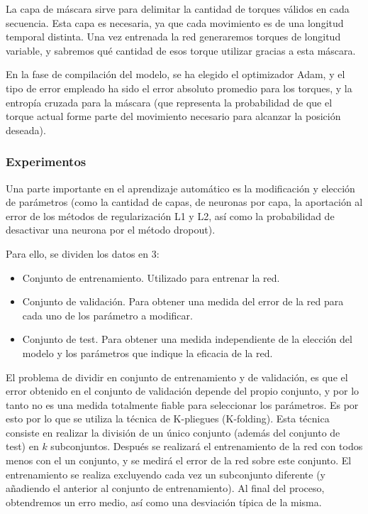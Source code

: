 La capa de máscara sirve para delimitar la cantidad de torques válidos en cada secuencia. Esta capa es necesaria, ya que cada movimiento es de una longitud temporal distinta. Una vez entrenada la red generaremos torques de longitud variable, y sabremos qué cantidad de esos torque utilizar gracias a esta máscara.

En la fase de compilación del modelo, se ha elegido el optimizador Adam, y el tipo de error empleado ha sido el error absoluto promedio para los torques, y la entropía cruzada para la máscara (que representa la probabilidad de que el torque actual forme parte del movimiento necesario para alcanzar la posición deseada).

\subsubsection{Experimentos}
Una parte importante en el aprendizaje automático es la modificación y elección de parámetros (como la cantidad de capas, de neuronas por capa, la aportación al error de los métodos de regularización L1 y L2, así como la probabilidad de desactivar una neurona por el método dropout).

Para ello, se dividen los datos en 3:

\begin{itemize}
	\item Conjunto de entrenamiento. Utilizado para entrenar la red.
	\item Conjunto de validación. Para obtener una medida del error de la red para cada uno de los parámetro a modificar.
	\item Conjunto de test. Para obtener una medida independiente de la elección del modelo y los parámetros que indique la eficacia de la red.
\end{itemize}

El problema de dividir en conjunto de entrenamiento y de validación, es que el error obtenido en el conjunto de validación depende del propio conjunto, y por lo tanto no es una medida totalmente fiable para seleccionar los parámetros. Es por esto por lo que se utiliza la técnica de K-pliegues (K-folding). Esta técnica consiste en realizar la división de un único conjunto (además del conjunto de test) en $k$ subconjuntos. Después se realizará el entrenamiento de la red con todos menos con el un conjunto, y se medirá el error de la red sobre este conjunto. El entrenamiento se realiza excluyendo cada vez un subconjunto diferente (y añadiendo el anterior al conjunto de entrenamiento). Al final del proceso, obtendremos un erro medio, así como una desviación típica de la misma.

